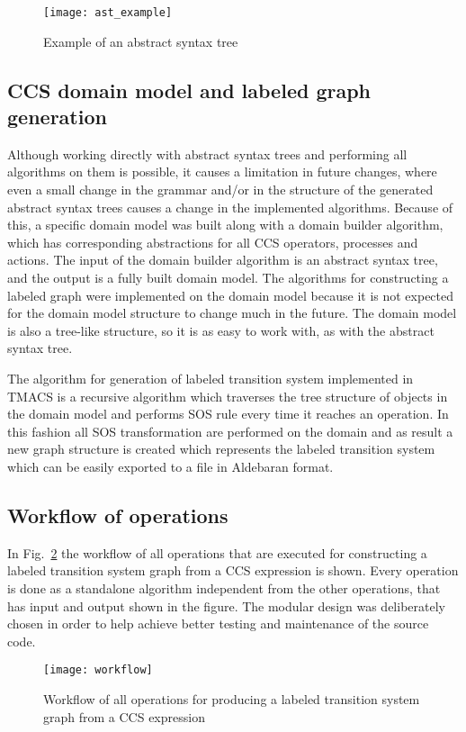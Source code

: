 \begin{figure}[h]
\centering
\texttt{[image: ast\_example]}
\caption{Example of an abstract syntax tree}
\label{fig:ast_example}
\end{figure}

\subsection{CCS domain model and labeled graph generation}
Although working directly with abstract syntax trees and performing all algorithms on them is possible, it causes 
a limitation in future changes, where even a small change in the grammar and/or in the structure of the
generated abstract syntax trees causes a change in the implemented algorithms. Because of this,
a specific domain model was built along with a domain builder algorithm, which has corresponding
abstractions for all CCS operators, processes and actions. The input of the domain builder algorithm 
is an abstract syntax tree, and the output is a fully built domain model. The algorithms for constructing a labeled graph 
were implemented on the domain model because it is not expected for the domain model structure to 
change much in the future. The domain model is also a tree-like structure, so it is as easy to work with, 
as with the abstract syntax tree. 

The algorithm for generation of labeled transition system implemented in TMACS is a recursive algorithm which 
traverses the tree structure of objects in the domain model and performs SOS rule every time it reaches an operation.
In this fashion all SOS transformation are performed on the domain and as result a new graph
structure is created which represents the labeled transition system which can be easily exported to a file
in Aldebaran format.

\subsection{Workflow of operations}
In Fig.~\ref{fig:workflow} the workflow of all operations that are executed for constructing a labeled transition system graph from a 
CCS expression is shown. Every operation is done as a standalone algorithm independent from the other operations,
that has input and output shown in the figure. The modular design was deliberately chosen in order to help achieve better 
testing and maintenance of the source code. 

\begin{figure}[h]
\centering
\texttt{[image: workflow]}
\caption{Workflow of all operations for producing a labeled transition system graph from a CCS expression}
\label{fig:workflow}
\end{figure}

